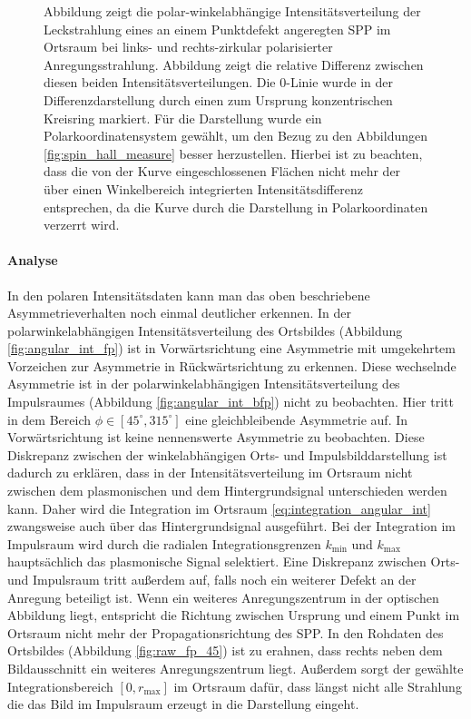 \documentclass[titlepage,  ngerman]{article}
\begin{document}
\begin{figure}[h]
			\caption[Polarwinkel Auswertung Impulsraum]{Abbildung  zeigt die polar-winkelabhängige Intensitätsverteilung der Leckstrahlung eines an einem Punktdefekt angeregten SPP im Ortsraum bei links- und rechts-zirkular polarisierter Anregungsstrahlung. Abbildung  zeigt die relative Differenz zwischen diesen beiden Intensitätsverteilungen. Die $0$-Linie wurde in der Differenzdarstellung durch einen zum Ursprung konzentrischen Kreisring markiert. Für die Darstellung wurde ein Polarkoordinatensystem gewählt, um den Bezug zu den Abbildungen \ref{fig:spin_hall_measure} besser herzustellen. Hierbei ist zu beachten, dass die von der Kurve eingeschlossenen Flächen nicht mehr der über einen Winkelbereich integrierten Intensitätsdifferenz entsprechen, da die Kurve durch die Darstellung in Polarkoordinaten verzerrt wird.}
			\label{fig:angular_dist_bfp}
		\end{figure}
		\paragraph{Analyse}
		In den polaren Intensitätsdaten kann man das oben beschriebene Asymmetrieverhalten noch einmal deutlicher erkennen. In der polarwinkelabhängigen Intensitätsverteilung des Ortsbildes (Abbildung \ref{fig:angular_int_fp}) ist in Vorwärtsrichtung eine Asymmetrie mit umgekehrtem Vorzeichen zur Asymmetrie in Rückwärtsrichtung zu erkennen. Diese wechselnde Asymmetrie ist in der polarwinkelabhängigen Intensitätsverteilung des Impulsraumes (Abbildung \ref{fig:angular_int_bfp}) nicht zu beobachten. Hier tritt in dem Bereich $\phi \in [45^\circ, 315^\circ]$ eine gleichbleibende Asymmetrie auf. In Vorwärtsrichtung ist keine nennenswerte Asymmetrie zu beobachten. Diese Diskrepanz zwischen der winkelabhängigen Orts- und Impulsbilddarstellung ist dadurch zu erklären, dass in der Intensitätsverteilung im Ortsraum nicht zwischen dem plasmonischen und dem Hintergrundsignal unterschieden werden kann. Daher wird die Integration im Ortsraum \eqref{eq:integration_angular_int} zwangsweise auch über das Hintergrundsignal ausgeführt. Bei der Integration im Impulsraum wird durch die radialen Integrationsgrenzen $k_\mathrm{min}$ und $k_\mathrm{max}$ hauptsächlich das plasmonische Signal selektiert. Eine Diskrepanz zwischen Orts- und Impulsraum tritt außerdem auf, falls noch ein weiterer Defekt an der Anregung beteiligt ist. Wenn ein weiteres Anregungszentrum in der optischen Abbildung liegt, entspricht die Richtung zwischen Ursprung und einem Punkt im Ortsraum nicht mehr der Propagationsrichtung des SPP. In den Rohdaten des Ortsbildes (Abbildung \ref{fig:raw_fp_45}) ist zu erahnen, dass rechts neben dem Bildausschnitt ein weiteres Anregungszentrum liegt. Außerdem sorgt der gewählte Integrationsbereich $[0, r_\mathrm{max}]$ im Ortsraum dafür, dass längst nicht alle Strahlung die das Bild im Impulsraum erzeugt in die Darstellung eingeht.
		
\end{document}
